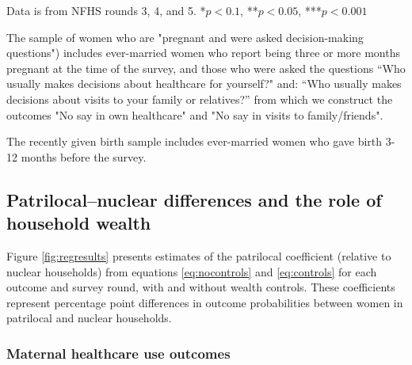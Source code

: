 \documentclass[12pt]{article}
\begin{document}
\begin{landscape}
\begin{table}[!htbp]
    \centering
    \begin{threeparttable}[t]
        \caption{:  Pregnant women in patrilocal extended households are advantaged in wealth and maternal healthcare use, but disadvantaged in autonomy outcomes}
        \label{tab:sumstats}

        \scriptsize
        \setlength{\tabcolsep}{6pt}
        \renewcommand{\arraystretch}{1.1}
        \label{tab:sumstats}
        

        \begin{tablenotes}
            \item Data is from NFHS rounds 3, 4, and 5. *$p<0.1$, **$p<0.05$, ***$p<0.001$
            \item The sample of women who are "pregnant and were asked decision-making questions") includes ever-married women who report being three or more months pregnant at the time of the survey, and those who were asked the questions ``Who usually makes decisions about healthcare for yourself?"  and: ``Who usually makes decisions about visits to your family or relatives?'' from which we construct the outcomes "No say in own healthcare" and "No say in visits to family/friends". 
            \item The recently given birth sample includes ever-married women who gave birth 3-12 months before the survey. 
        \end{tablenotes}
    \end{threeparttable}
\end{table}
\end{landscape}



\subsection{Patrilocal–nuclear differences and the role of household wealth}

Figure \ref{fig:regresults} presents estimates of the patrilocal coefficient (relative to nuclear households) from equations \ref{eq:nocontrols} and \ref{eq:controls} for each outcome and survey round, with and without wealth controls. These coefficients represent percentage point differences in outcome probabilities between women in patrilocal and nuclear households.

\subsubsection{ Maternal healthcare use outcomes}
\end{document}
